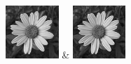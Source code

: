 \begin{table}[h!]
\begin{tabular}
        \includegraphics[width=2cm]{images/processed/flower/gaussian_5x5_sigma1.0/unblurred_10-iter.png} &
        \includegraphics[width=2cm]{images/processed/flower/gaussian_5x5_sigma2.0/unblurred_10-iter.png}                                                                                                                                                                                                 \\
    \end{tabular}
\end{table}

